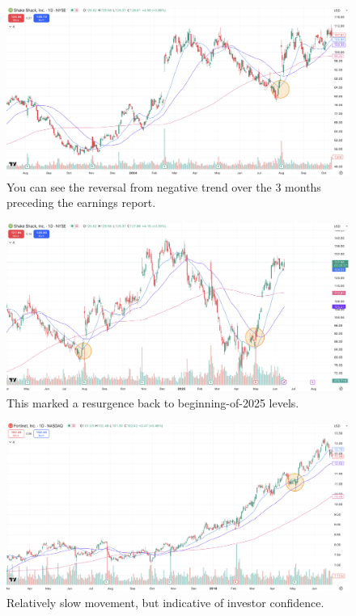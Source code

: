 \documentclass[11pt]{article}
\begin{document}
    \begin{figure}[H]
        \centering
        \includegraphics[width=1.0\linewidth]{images/SHAK1.png}
        \caption{You can see the reversal from negative trend over the 3 months preceding the earnings report.}
        \label{fig:SHAK1}
    \end{figure}

    \begin{figure}[H]
        \centering
        \includegraphics[width=1.0\linewidth]{images/SHAK2.png}
        \caption{This marked a resurgence back to beginning-of-2025 levels.}
        \label{fig:SHAK2}
    \end{figure}

    \begin{figure}[H]
        \centering
        \includegraphics[width=1.0\linewidth]{images/FTNT1.png}
        \caption{Relatively slow movement, but indicative of investor confidence.}
        \label{fig:FTNT1}
    \end{figure}
\end{document}
